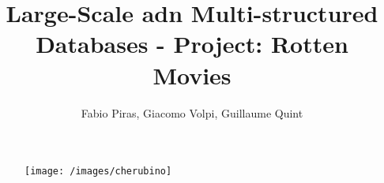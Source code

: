 

\author{Fabio Piras, Giacomo Volpi, Guillaume Quint}
\title{Large-Scale adn Multi-structured Databases - Project: Rotten Movies}
\date{}

\begin{figure}
\centering
\texttt{[image: /images/cherubino]}

\end{figure}

\maketitle


\newpage

\tableofcontents



%

%

%


